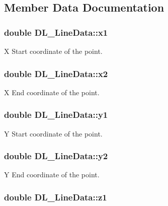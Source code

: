 \subsection{Member Data Documentation}
\hypertarget{structDL__LineData_a40e8e23e9a5bbabdbd65bbc3ce776a69}{
\subsubsection[{x1}]{\setlength{\rightskip}{0pt plus 5cm}double D\-L\-\_\-\-Line\-Data\-::x1}}\label{structDL__LineData_a40e8e23e9a5bbabdbd65bbc3ce776a69}
X Start coordinate of the point. \hypertarget{structDL__LineData_ab58b66255dc37f000dea00c39c0434ca}{
\subsubsection[{x2}]{\setlength{\rightskip}{0pt plus 5cm}double D\-L\-\_\-\-Line\-Data\-::x2}}\label{structDL__LineData_ab58b66255dc37f000dea00c39c0434ca}
X End coordinate of the point. \hypertarget{structDL__LineData_a4e9aa2087e8f4789221d859c20176a6a}{
\subsubsection[{y1}]{\setlength{\rightskip}{0pt plus 5cm}double D\-L\-\_\-\-Line\-Data\-::y1}}\label{structDL__LineData_a4e9aa2087e8f4789221d859c20176a6a}
Y Start coordinate of the point. \hypertarget{structDL__LineData_af11da9e6e67cd3a85fa802fafafe9a81}{
\subsubsection[{y2}]{\setlength{\rightskip}{0pt plus 5cm}double D\-L\-\_\-\-Line\-Data\-::y2}}\label{structDL__LineData_af11da9e6e67cd3a85fa802fafafe9a81}
Y End coordinate of the point. \hypertarget{structDL__LineData_af9f75af211622aa8ecfb6a3286c33078}{
\subsubsection[{z1}]{\setlength{\rightskip}{0pt plus 5cm}double D\-L\-\_\-\-Line\-Data\-::z1}}\label{structDL__LineData_af9f75af211622aa8ecfb6a3286c33078}
